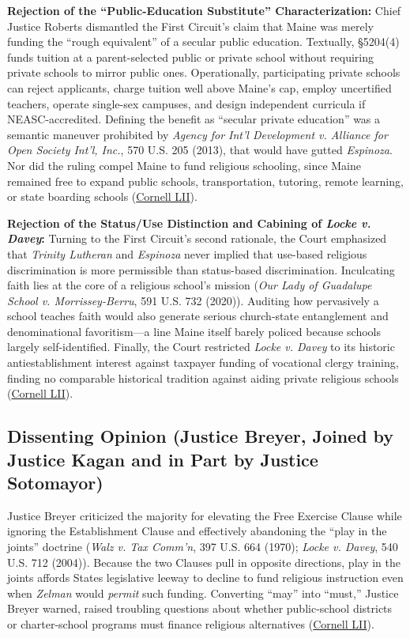 \documentclass[12pt]{article}
\begin{document}
\textbf{Rejection of the ``Public-Education Substitute'' Characterization:} Chief Justice Roberts dismantled the First Circuit's claim that Maine was merely funding the ``rough equivalent'' of a secular public education. Textually, \S 5204(4) funds tuition at a parent-selected public or private school without requiring private schools to mirror public ones. Operationally, participating private schools can reject applicants, charge tuition well above Maine's cap, employ uncertified teachers, operate single-sex campuses, and design independent curricula if NEASC-accredited. Defining the benefit as ``secular private education'' was a semantic maneuver prohibited by \textit{Agency for Int'l Development v. Alliance for Open Society Int'l, Inc.}, 570 U.S. 205 (2013), that would have gutted \textit{Espinoza}. Nor did the ruling compel Maine to fund religious schooling, since Maine remained free to expand public schools, transportation, tutoring, remote learning, or state boarding schools (\href{https://www.law.cornell.edu/supremecourt/text/20-1088}{Cornell LII}).

\textbf{Rejection of the Status/Use Distinction and Cabining of \textit{Locke v. Davey}:} Turning to the First Circuit's second rationale, the Court emphasized that \textit{Trinity Lutheran} and \textit{Espinoza} never implied that use-based religious discrimination is more permissible than status-based discrimination. Inculcating faith lies at the core of a religious school's mission (\textit{Our Lady of Guadalupe School v. Morrissey-Berru}, 591 U.S. 732 (2020)). Auditing how pervasively a school teaches faith would also generate serious church-state entanglement and denominational favoritism---a line Maine itself barely policed because schools largely self-identified. Finally, the Court restricted \textit{Locke v. Davey} to its historic antiestablishment interest against taxpayer funding of vocational clergy training, finding no comparable historical tradition against aiding private religious schools (\href{https://www.law.cornell.edu/supremecourt/text/20-1088}{Cornell LII}).

\subsection{Dissenting Opinion (Justice Breyer, Joined by Justice Kagan and in Part by Justice Sotomayor)}

Justice Breyer criticized the majority for elevating the Free Exercise Clause while ignoring the Establishment Clause and effectively abandoning the ``play in the joints'' doctrine (\textit{Walz v. Tax Comm'n}, 397 U.S. 664 (1970); \textit{Locke v. Davey}, 540 U.S. 712 (2004)). Because the two Clauses pull in opposite directions, play in the joints affords States legislative leeway to decline to fund religious instruction even when \textit{Zelman} would \textit{permit} such funding. Converting ``may'' into ``must,'' Justice Breyer warned, raised troubling questions about whether public-school districts or charter-school programs must finance religious alternatives (\href{https://www.law.cornell.edu/supremecourt/text/20-1088}{Cornell LII}).
\end{document}
